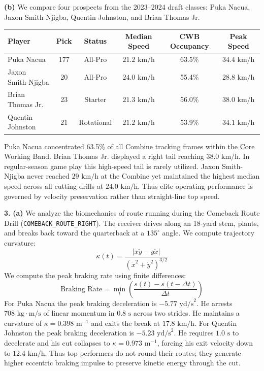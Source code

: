 \documentclass[11pt]{article}
\newcommand{\code}[1]{\texttt{\small #1}}
\begin{document}
\noindent\textbf{(b)}
We compare four prospects from the 2023--2024 draft classes: Puka Nacua, Jaxon Smith-Njigba, Quentin Johnston, and Brian Thomas Jr.

\begin{center}
\small
\begin{tabular}{lccccc}
\toprule
\textbf{Player} & \textbf{Pick} & \textbf{Status} & \textbf{Median Speed} & \textbf{CWB Occupancy} & \textbf{Peak Speed} \\
\midrule
Puka Nacua & 177 & All-Pro & $21.2 \text{ km/h}$ & 63.5\% & $34.4 \text{ km/h}$ \\
Jaxon Smith-Njigba & 20 & All-Pro & $24.0 \text{ km/h}$ & 55.4\% & $28.8 \text{ km/h}$ \\
Brian Thomas Jr. & 23 & Starter & $21.3 \text{ km/h}$ & 56.0\% & $38.0 \text{ km/h}$ \\
Quentin Johnston & 21 & Rotational & $21.2 \text{ km/h}$ & 53.9\% & $34.1 \text{ km/h}$ \\
\bottomrule
\end{tabular}
\end{center}

Puka Nacua concentrated 63.5\% of all Combine tracking frames within the Core Working Band. Brian Thomas Jr. displayed a right tail reaching $38.0 \text{ km/h}$. In regular-season game play this high-speed tail is rarely utilized. Jaxon Smith-Njigba never reached $29 \text{ km/h}$ at the Combine yet maintained the highest median speed across all cutting drills at $24.0 \text{ km/h}$. Thus elite operating performance is governed by velocity preservation rather than straight-line top speed.

\newpage

\noindent\textbf{3.}
\noindent\textbf{(a)}
We analyze the biomechanics of route running during the Comeback Route Drill (\code{COMEBACK\_ROUTE\_RIGHT}). The receiver drives along an 18-yard stem, plants, and breaks back toward the quarterback at a $135^\circ$ angle. We compute trajectory curvature:
\[ \kappa(t) = \frac{|\dot{x}\ddot{y} - \dot{y}\ddot{x}|}{(\dot{x}^2 + \dot{y}^2)^{3/2}} \]
We compute the peak braking rate using finite differences:
\[ \text{Braking Rate} = \min_{t} \left(\frac{s(t) - s(t - \Delta t)}{\Delta t}\right) \]
For Puka Nacua the peak braking deceleration is $-5.77 \text{ yd/s}^2$. He arrests $708 \text{ kg}\cdot\text{m/s}$ of linear momentum in $0.8 \text{ s}$ across two strides. He maintains a curvature of $\kappa = 0.398 \text{ m}^{-1}$ and exits the break at $17.8 \text{ km/h}$. For Quentin Johnston the peak braking deceleration is $-5.23 \text{ yd/s}^2$. He requires $1.0 \text{ s}$ to decelerate and his cut collapses to $\kappa = 0.973 \text{ m}^{-1}$, forcing his exit velocity down to $12.4 \text{ km/h}$. Thus top performers do not round their routes; they generate higher eccentric braking impulse to preserve kinetic energy through the cut.
\end{document}

